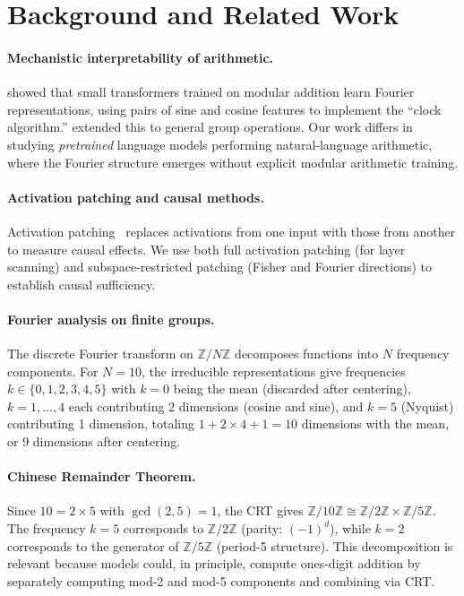 \section{Background and Related Work}
\label{sec:background}

\paragraph{Mechanistic interpretability of arithmetic.} \citet{nanda2023progress} showed that small transformers trained on modular addition learn Fourier representations, using pairs of sine and cosine features to implement the ``clock algorithm.'' \citet{zhong2024clock} extended this to general group operations. Our work differs in studying \emph{pretrained} language models performing natural-language arithmetic, where the Fourier structure emerges without explicit modular arithmetic training.

\paragraph{Activation patching and causal methods.} Activation patching~\citep{vig2020investigating,meng2022locating,geiger2024finding} replaces activations from one input with those from another to measure causal effects. We use both full activation patching (for layer scanning) and subspace-restricted patching (Fisher and Fourier directions) to establish causal sufficiency.

\paragraph{Fourier analysis on finite groups.} The discrete Fourier transform on $\mathbb{Z}/N\mathbb{Z}$ decomposes functions into $N$ frequency components. For $N{=}10$, the irreducible representations give frequencies $k \in \{0, 1, 2, 3, 4, 5\}$ with $k{=}0$ being the mean (discarded after centering), $k{=}1,\ldots,4$ each contributing 2 dimensions (cosine and sine), and $k{=}5$ (Nyquist) contributing 1 dimension, totaling $1 + 2{\times}4 + 1 = 10$ dimensions with the mean, or 9 dimensions after centering.

\paragraph{Chinese Remainder Theorem.} Since $10 = 2 \times 5$ with $\gcd(2,5) = 1$, the CRT gives $\mathbb{Z}/10\mathbb{Z} \cong \mathbb{Z}/2\mathbb{Z} \times \mathbb{Z}/5\mathbb{Z}$. The frequency $k{=}5$ corresponds to $\mathbb{Z}/2\mathbb{Z}$ (parity: $(-1)^d$), while $k{=}2$ corresponds to the generator of $\mathbb{Z}/5\mathbb{Z}$ (period-5 structure). This decomposition is relevant because models could, in principle, compute ones-digit addition by separately computing mod-2 and mod-5 components and combining via CRT.
